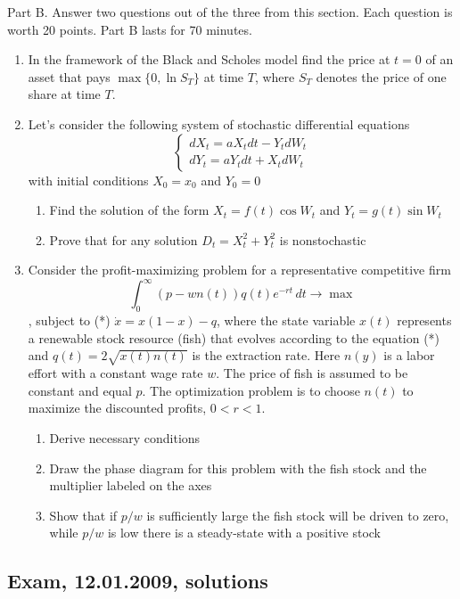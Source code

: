 \documentclass[12pt, a4paper]{article}
\begin{document}
Part B.
Answer two questions out of the three from this section. Each question is worth 20 points.
Part B lasts for 70 minutes.
\begin{enumerate}[resume]
\item  In the framework of the Black and Scholes model find the price at $t=0$ of an asset that pays $\max\{0,\ln S_T\}$  at time $T$, where $S_T$ denotes the price of one share at time $T$.

\item Let’s consider the following system of stochastic differential equations
\[
\left\{
  \begin{array}{l}
    dX_t=aX_t dt-Y_t dW_t \\
    dY_t=aY_t dt+X_t dW_t
  \end{array}
\right.
\]
with initial conditions $X_0=x_0$ and $Y_0=0$
\begin{enumerate}
\item Find the solution of the form $X_t=f(t)\cos W_t$ and $Y_t=g(t)\sin W_t$
\item Prove that for any solution $D_t=X_t^2+Y_t^2$ is nonstochastic
\end{enumerate}


\item Consider the profit-maximizing problem for a representative competitive firm
\[
\int_0^{\infty} (p-wn(t))q(t)e^{-rt}\, dt \to \max
\]
, subject to (*) $\dot{x}=x(1-x)-q$, where the state variable $x(t)$ represents a renewable stock resource (fish) that evolves according to the equation (*) and $q(t)=2\sqrt{x(t)n(t)}$ is the extraction rate. Here $n(y)$ is a labor effort with a constant wage rate $w$. The price of fish is assumed to be constant and equal $p$.  The optimization problem is to choose $n(t)$ to maximize the discounted profits, $0<r<1$.
\begin{enumerate}
\item Derive necessary conditions
\item Draw the phase diagram for this problem with the fish stock and the multiplier labeled on the axes
\item Show that if $p/w$ is sufficiently large the fish stock will be driven to zero, while $p/w$ is low there is a steady-state with a positive stock
\end{enumerate}
\end{enumerate}

\subsection{Exam, 12.01.2009, solutions}
\end{document}
